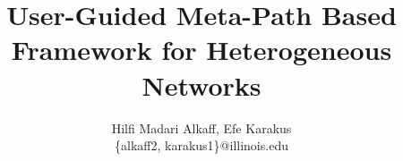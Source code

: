 \documentclass[letterpaper,twocolumn,10pt]{article}
\begin{document}
\date{}

\title{\Large \bf User-Guided Meta-Path Based Framework for Heterogeneous Networks}
\author{
    {\rm Hilfi Madari Alkaff, Efe Karakus}\\
    \{alkaff2, karakus1\}@illinois.edu
}

\maketitle
\thispagestyle{empty}










\end{document}
